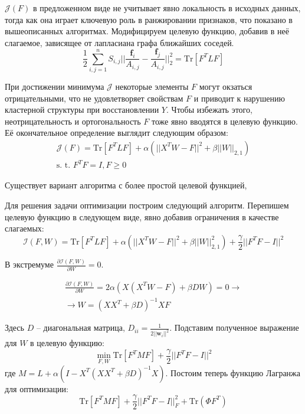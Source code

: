 $\mathcal{J}(F)$ в предложенном виде не учитывает явно локальность в исходных данных, тогда как она играет ключевую роль в ранжировании признаков, что показано в вышеописанных алгоритмах. Модифицируем целевую функцию, добавив в неё слагаемое, зависящее от лапласиана графа ближайших соседей. 
\begin{equation}
	\frac12 \sum_{i,j=1}^n S_{i,j} ||\frac{\mathbf{f}_i}{A_{i,j}}  - \frac{\mathbf{f}_j}{A_{i,j}}||^2_2 = \text{Tr}[F^T L F]
\end{equation}

При достижении минимума $\mathcal{J}$ некоторые элементы $F$ могут окзаться отрицательными, что не удовлетворяет свойствам $F$  и приводит к нарушению кластерной структуры при восстановлении $Y$. Чтобы избежать этого, неотрицательность и ортогональность $F$ тоже явно вводятся в целевую функцию. Её окончательное определение выглядит следующим образом:
\begin{equation}
	\begin{array}{r}
		\mathcal{J}(F) = \text{Tr}[F^T L F] + \alpha(||X^T W - F||^2 + \beta||W||_{2,1}) \\
		\text{s. t. } F^T F = I, F \geq 0
	\end{array}
\end{equation}

Существует вариант алгоритма с более простой целевой функцией, 

Для решения задачи оптимизации построим следующий алгоритм. Перепишем целевую функцию в следующем виде, явно добавив ограничения в качестве слагаемых:
\begin{equation}
	\mathcal{I}(F, W) = \text{Tr}[F^T L F] + \alpha(||X^T W - F||^2 + \beta ||W||^2_{2,1}) + \frac{\gamma}{2} ||F^T F - I||^2
\end{equation}

В экстремуме $\frac{ \partial\mathcal{I}(F, W)}{\partial W} = 0$.

\begin{equation}
	\begin{array}{r}
	\frac{\partial{\mathcal{I}(F, W)}}{\partial{W}} = 2 \alpha (X (X^T W - F) + \beta D W) = 0 \rightarrow \\
\rightarrow W = (XX^T + \beta D)^{-1} X F
	\end{array} 
\end{equation}

Здесь $D$ -- диагональная матрица, $D_{ii} = \frac{1}{2 ||\mathbf{w}_i||^2}$. Подставим полученное выражение для $W$ в целевую функцию:
\begin{equation}
	\min_{F, W} \text{Tr} [F^T M F ] + \frac{\gamma}2||F^T F - I||^2
\end{equation}
где $M=L + \alpha(I - X^T(X X^T + \beta D)^{-1} X)$. Постоим теперь функцию Лагранжа для оптимизации:
\begin{equation}
	\text{Tr}[F^T M F] + \frac\gamma2||F^T F - I||^2_F + \text{Tr}(\Phi F^T)
\end{equation}

